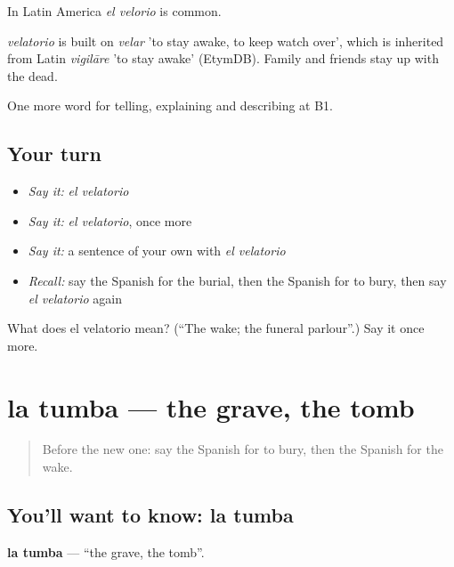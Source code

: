 In Latin America \emph{el velorio} is common.

\begin{cousinweb}
\emph{velatorio} is built on \emph{velar} 'to stay awake, to keep watch over', which is inherited from Latin \emph{vigilāre} 'to stay awake' (EtymDB). Family and friends stay up with the dead.
\end{cousinweb}

\begin{grammarlens}[title={What you've built}]
One more word for telling, explaining and describing at B1.
\end{grammarlens}

\subsection*{Your turn}
\begin{itemize}
\raggedright
  \item \emph{Say it:} \emph{el velatorio}
  \item \emph{Say it:} \emph{el velatorio}, once more
  \item \emph{Say it:} a sentence of your own with \emph{el velatorio}
  \item \emph{Recall:} say the Spanish for the burial, then the Spanish for to bury, then say \emph{el velatorio} again
\end{itemize}

\begin{tcolorbox}[breakable,colback=teal!4,colframe=teal!35!black,title={Before you move on}]
What does el velatorio mean? (\textquotedblleft{}The wake; the funeral parlour\textquotedblright{}.) Say it once more.
\end{tcolorbox}
\section[la tumba]{la tumba — the grave, the tomb}

\label{lesson:ES-C556-tumba}



\begin{quote}
Before the new one: say the Spanish for to bury, then the Spanish for the wake.
\end{quote}

\subsection*{You'll want to know: la tumba}
\textbf{la tumba} — \textquotedblleft{}the grave, the tomb\textquotedblright{}.

